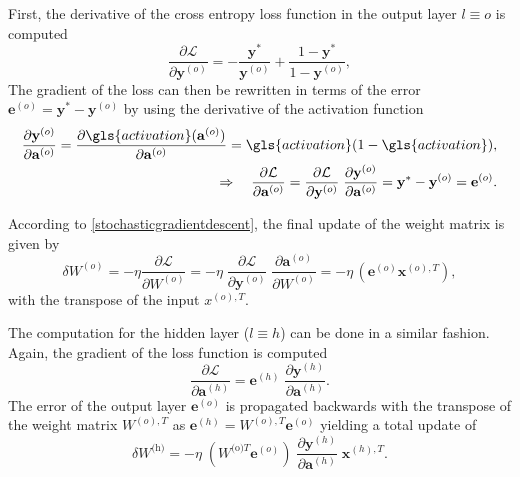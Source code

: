 First, the derivative of the cross entropy loss function in the output layer $l\equiv o$ is computed
\begin{equation*}
\frac{\partial\mathcal{L}}{\partial \mathbf{y}^{(o)}} = 
- \frac{\mathbf{y}^*}{\mathbf{y}^{(o)}} + 
\frac{1 - \mathbf{y}^*}{1 - \mathbf{y}^{(o)}},
\end{equation*}
The gradient of the loss can then be rewritten in terms of the error $\mathbf{e}^{(o)} = \mathbf{y}^* - \mathbf{y}^{(o)}$ by using the derivative of the activation function
\begin{align*}
\frac{\partial \mathbf{y}^{(o)}}{\partial \mathbf{a}^{(o)}} = \frac{\partial \gls{activation}(\mathbf{a}^{(o)})}{\partial \mathbf{a}^{(o)}} = \gls{activation} (1 - \gls{activation}),\\
\Rightarrow \quad \frac{\partial\mathcal{L}}{\partial \mathbf{a}^{(o)}} =
\frac{\partial\mathcal{L}}{\partial \mathbf{y}^{(o)}} 
\; \frac{\partial \mathbf{y}^{(o)}}{\partial \mathbf{a}^{(o)}} =
\mathbf{y}^* - \mathbf{y}^{(o)} = \mathbf{e}^{(o)}.
\end{align*}

According to \cref{stochasticgradientdescent}, the final update of the weight matrix is given by
\begin{equation}
\delta W^{(o)} = - \eta \frac{\partial \mathcal{L}}{\partial W^{(o)}} 
= - \eta \;
\frac{\partial\mathcal{L}}{\partial \mathbf{y}^{(o)}} \;
\frac{\partial \mathbf{a}^{(o)}}{\partial W^{(o)}}
= - \eta \, \left(\mathbf{e}^{(o)} \mathbf{x}^{(o),T}\right),
\label{backpropupdate}
\end{equation}
with the transpose of the input $x^{(o),T}$.

The computation for the hidden layer ($l\equiv h$) can be done in a similar fashion. Again, the gradient of the loss function is computed
\begin{equation*}
\frac{\partial\mathcal{L}}{\partial \mathbf{a}^{(h)}} = \mathbf{e}^{(h)} \;
\frac{\partial \mathbf{y}^{(h)} }{\partial \mathbf{a}^{(h)}}.
\end{equation*}
The error of the output layer $\mathbf{e}^{(o)}$ is propagated backwards with the transpose of the weight matrix $W^{(o),T}$ as $\mathbf{e}^{(h)}=W^{(o),T}\mathbf{e}^{(o)}$ yielding a total update of
\begin{equation*}
\delta W^{\text{(h)}} = - \eta \;
\left(W^{\text{(o)}T} \mathbf{e}^{(o)}\right) \;
\frac{\partial \mathbf{y}^{(h)} }{\partial \mathbf{a}^{(h)}} \; \mathbf{x}^{(h), T}.
\end{equation*}

